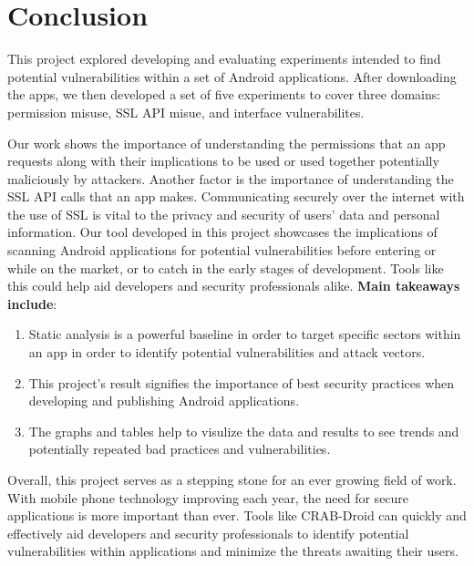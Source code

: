\section{Conclusion}
\label{sec:conc}


This project explored developing and evaluating experiments intended to find potential vulnerabilities within a set of Android applications. 
After downloading the apps, we then developed a set of five experiments to cover three domains: permission misuse, SSL API misue, and interface vulnerabilites.

Our work shows the importance of understanding the permissions that an app requests along with their implications to be used or used together potentially maliciously by attackers. 
Another factor is the importance of understanding the SSL API calls that an app makes. Communicating securely over the internet with the use of SSL is vital to the privacy and security 
of users' data and personal information. Our tool developed in this project showcases the implications of scanning Android applications for potential vulnerabilities before entering or while on the market, 
or to catch in the early stages of development. Tools like this could help aid developers and security professionals alike. 
\bigskip
\newline
\textbf{Main takeaways include}:
\begin{enumerate}
    \item Static analysis is a powerful baseline in order to target specific sectors within an app in order to identify potential vulnerabilities and attack vectors.
    \item This project's result signifies the importance of best security practices when developing and publishing Android applications.
    \item The graphs and tables help to visulize the data and results to see trends and potentially repeated bad practices and vulnerabilities. 
\end{enumerate}

Overall, this project serves as a stepping stone for an ever growing field of work. With mobile phone technology improving each year, the need for secure applications is more important than ever.
Tools like CRAB-Droid can quickly and effectively aid developers and security professionals to identify potential vulnerabilities within applications and minimize the threats awaiting their users.
